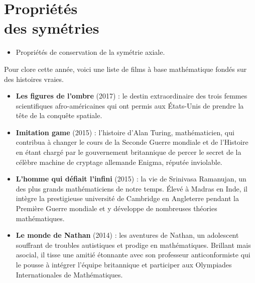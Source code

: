 \themaG
\graphicspath{{../Ch25_La_symetrie_axiale/Images/}}

\chapter{Propriétés\\des symétries}
\label{C32}


\begin{prerequis}
   \begin{itemize}
      \item Propriétés de conservation de la symétrie axiale.
   \end{itemize}
\end{prerequis}

\vfill

\begin{debat}
   Pour clore cette année, voici une liste de films à base mathématique fondés sur des histoires vraies.
   \begin{itemize}
       \item {\bf Les figures de l'ombre} (2017) : le destin extraordinaire des trois femmes scientifiques afro-américaines qui ont permis aux États-Unis de prendre la tête de la conquête spatiale.
       \item {\bf Imitation game} (2015) : l'histoire d'Alan Turing, mathématicien, qui contribua à changer le cours de la Seconde Guerre mondiale et de l’Histoire en étant chargé par le gouvernement britannique de percer le secret de la célèbre machine de cryptage allemande Enigma, réputée inviolable.
           \item {\bf L'homme qui défiait l'infini} (2015) : la vie de Srinivasa Ramanujan, un des plus grands mathématiciens de notre temps. Élevé à Madras en Inde, il intègre la prestigieuse université de Cambridge en Angleterre pendant la Première Guerre mondiale et y développe de nombreuses théories mathématiques.
      \item {\bf Le monde de Nathan} (2014) : les aventures de Nathan, un adolescent souffrant de troubles autistiques et prodige en mathématiques. Brillant mais asocial, il tisse une amitié étonnante avec son professeur anticonformiste qui le pousse à intégrer l’équipe britannique et participer aux Olympiades Internationales de Mathématiques.
   \end{itemize}
\end{debat}

